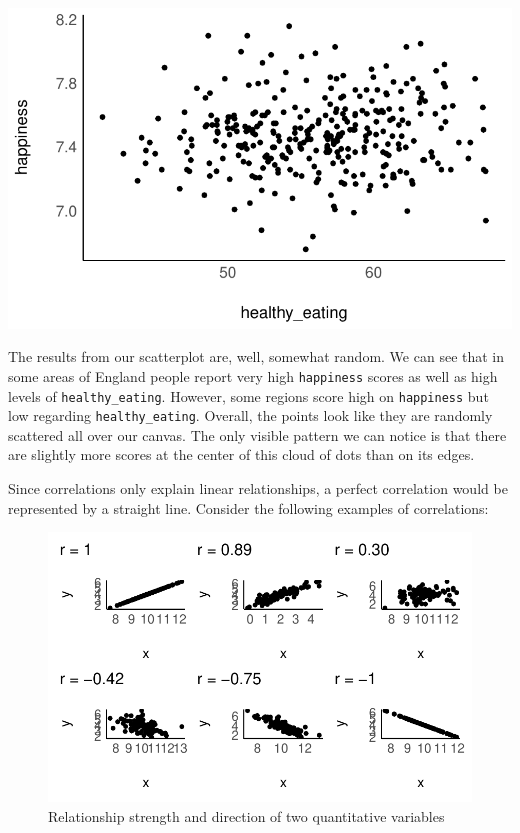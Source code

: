 \documentclass[
  letterpaper,
  DIV=11,
  numbers=noendperiod]{scrreprt}
\begin{document}
\includegraphics{10_correlations_files/figure-latex/correlation-happiness-healthy-eating-1.pdf}

The results from our scatterplot are, well, somewhat random. We can see
that in some areas of England people report very high \texttt{happiness}
scores as well as high levels of \texttt{healthy\_eating}. However, some
regions score high on \texttt{happiness} but low regarding
\texttt{healthy\_eating}. Overall, the points look like they are
randomly scattered all over our canvas. The only visible pattern we can
notice is that there are slightly more scores at the center of this
cloud of dots than on its edges.

Since correlations only explain linear relationships, a perfect
correlation would be represented by a straight line. Consider the
following examples of correlations:

\begin{figure}[H]

{\centering \includegraphics{10_correlations_files/figure-latex/correlation-examples-1.pdf}

}

\caption{Relationship strength and direction of two quantitative
variables}

\end{figure}%
\end{document}
